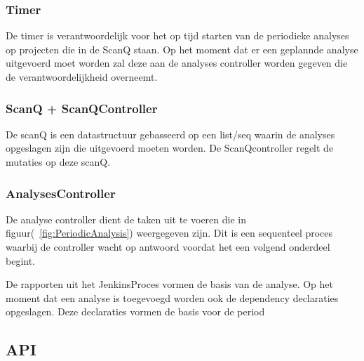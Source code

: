 \subsubsection{Timer}
De timer is verantwoordelijk voor het op tijd starten van de periodieke analyses op projecten die in de ScanQ staan. Op het moment dat er een geplannde analyse uitgevoerd moet worden zal deze aan de analyses controller worden gegeven die de verantwoordelijkheid overneemt.
\subsubsection{ScanQ + ScanQController}
De scanQ is een datastructuur gebasseerd op een list/seq waarin de analyses opgeslagen zijn die uitgevoerd moeten worden. De ScanQcontroller regelt de mutaties op deze scanQ.
\subsubsection{AnalysesController}
De analyse controller dient de taken uit te voeren die in figuur(~\ref{fig:PeriodicAnalysis}) weergegeven zijn. Dit is een sequenteel proces waarbij de controller wacht op antwoord voordat het een volgend onderdeel begint.



De rapporten uit het JenkinsProces vormen de basis van de analyse. Op het moment dat een analyse is toegevoegd worden ook de dependency declaraties opgeslagen. Deze declaraties vormen de basis voor de period

\subsection{API}\label{subsec:api}







